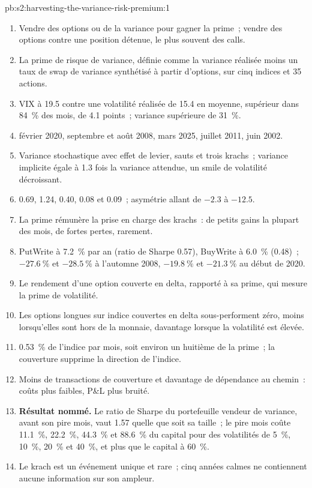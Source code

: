 \begin{solution}{pb:s2:harvesting-the-variance-risk-premium:1}
\begin{enumerate}
\item Vendre des options ou de la variance pour gagner la prime~; vendre des options contre une position détenue, le plus souvent des calls.
\item La prime de risque de variance, définie comme la variance réalisée moins un taux de swap de variance synthétisé à partir d'options, sur cinq indices et 35 actions.
\item VIX à 19.5 contre une volatilité réalisée de 15.4 en moyenne, supérieur dans 84~\% des mois, de 4.1 points~; variance supérieure de 31~\%.
\item février 2020, septembre et août 2008, mars 2025, juillet 2011, juin 2002.
\item Variance stochastique avec effet de levier, sauts et trois krachs~; variance implicite égale à 1.3 fois la variance attendue, un smile de volatilité décroissant.
\item 0.69, 1.24, 0.40, 0.08 et 0.09~; asymétrie allant de $-2.3$ à $-12.5$.
\item La prime rémunère la prise en charge des krachs~: de petits gains la plupart des mois, de fortes pertes, rarement.
\item PutWrite à 7.2~\% par an (ratio de Sharpe 0.57), BuyWrite à 6.0~\% (0.48)~; $-27.6~\%$ et $-28.5~\%$ à l'automne 2008, $-19.8~\%$ et $-21.3~\%$ au début de 2020.
\item Le rendement d'une option couverte en delta, rapporté à sa prime, qui mesure la prime de volatilité.
\item Les options longues sur indice couvertes en delta sous-performent zéro, moins lorsqu'elles sont hors de la monnaie, davantage lorsque la volatilité est élevée.
\item 0.53~\% de l'indice par mois, soit environ un huitième de la prime~; la couverture supprime la direction de l'indice.
\item Moins de transactions de couverture et davantage de dépendance au chemin~: coûts plus faibles, P\&L plus bruité.
\item \textbf{Résultat nommé.} Le ratio de Sharpe du portefeuille vendeur de variance, avant son pire mois, vaut 1.57 quelle que soit sa taille~; le pire mois coûte 11.1~\%, 22.2~\%,
44.3~\% et 88.6~\% du capital pour des volatilités de 5~\%, 10~\%, 20~\% et 40~\%, et plus que le capital à 60~\%.
\item Le krach est un événement unique et rare~; cinq années calmes ne contiennent aucune information sur son ampleur.

\end{enumerate}
\end{solution}
